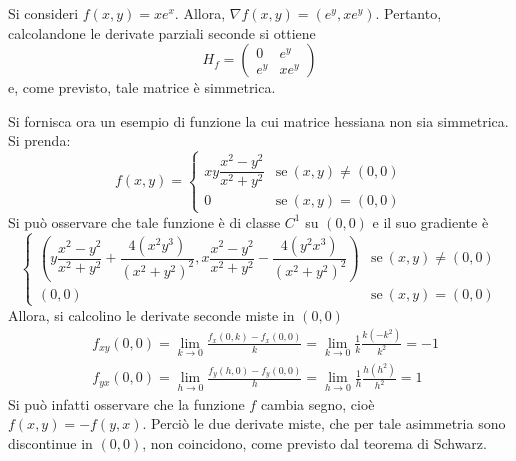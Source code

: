     \begin{example}
        Si consideri $f(x, y)=x e^x$. Allora, $\nabla f(x,y)=(e^y, xe^y)$.
        Pertanto, calcolandone le derivate parziali seconde si ottiene
        \begin{equation*}
            H_f=\begin{pmatrix}
                0 &e^y\\
                e^y &xe^y
            \end{pmatrix}
        \end{equation*}
        e, come previsto, tale matrice è simmetrica.
    \end{example}
    \begin{example}
        Si fornisca ora un esempio di funzione la cui matrice hessiana non sia simmetrica.\\
        Si prenda:
        \begin{equation*}
            f(x,y)=\begin{cases}
                xy \dfrac{x^2-y^2}{x^2+y^2} &\text{se}\ (x,y)\neq (0,0)\\
                0 &\text{se}\ (x,y)=(0,0)
            \end{cases}
        \end{equation*}
        Si può osservare che tale funzione è di classe $C^1$ su $(0,0)$ e il suo gradiente è
        \begin{equation*}
            \begin{cases}
                \left(y \dfrac{x^2-y^2}{x^2+y^2}+\dfrac{4(x^2y^3)}{(x^2+y^2)^2},x \dfrac{x^2-y^2}{x^2+y^2}-\dfrac{4(y^2x^3)}{(x^2+y^2)^2}\right) &\text{se}\ (x,y)\neq(0,0)\\
                (0,0) &\text{se}\ (x,y)=(0,0)
            \end{cases}
        \end{equation*}
        Allora, si calcolino le derivate seconde miste in $(0,0)$
        \begin{equation*}
            \begin{aligned}
                &f_{xy}(0,0)=\lim_{k \to 0}\frac{f_x(0,k)-f_x(0,0)}{k}= \lim_{k\to 0}{\frac{1}{k} \frac{k(-k^2)}{k^2}}=-1\\
                &f_{yx}(0,0)=\lim_{h \to 0} \frac{f_y(h,0)-f_y(0,0)}{h}=\lim_{h \to 0}{\frac{1}{h} \frac{h(h^2)}{h^2}}=1
            \end{aligned}
        \end{equation*}
        Si può infatti osservare che la funzione $f$ cambia segno, cioè $f(x,y)=-f(y,x)$. Perciò le due derivate miste, che per tale asimmetria sono discontinue in $(0,0)$, non coincidono, come previsto dal teorema di Schwarz.
    \end{example}
